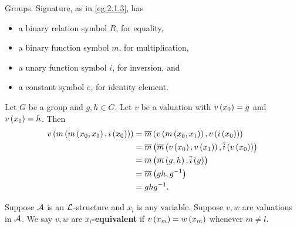 \begin{example*}
Groups. Signature, as in \ref{eg:2.1.3}, has
\begin{itemize}
\item a binary relation symbol $ R $, for equality,
\item a binary function symbol $ m $, for multiplication,
\item a unary function symbol $ i $, for inversion, and
\item a constant symbol $ e $, for identity element.
\end{itemize}
Let $ G $ be a group and $ g, h \in G $. Let $ v $ be a valuation with $ v\rb{x_0} = g $ and $ v\rb{x_1} = h $. Then
\begin{align*}
v\rb{m\rb{m\rb{x_0, x_1}, i\rb{x_0}}}
& = \overline{m}\rb{v\rb{m\rb{x_0, x_1}}, v\rb{i\rb{x_0}}} \\
& = \overline{m}\rb{\overline{m}\rb{v\rb{x_0}, v\rb{x_1}}, \overline{i}\rb{v\rb{x_0}}} \\
& = \overline{m}\rb{\overline{m}\rb{g, h}, \overline{i}\rb{g}} \\
& = \overline{m}\rb{gh, g^{-1}} \\
& = ghg^{-1}.
\end{align*}
\end{example*}

\begin{definition}
Suppose $ \AA $ is an $ \LL $-structure and $ x_l $ is any variable. Suppose $ v, w $ are valuations in $ \AA $. We say $ v, w $ are \textbf{$ x_l $-equivalent} if $ v\rb{x_m} = w\rb{x_m} $ whenever $ m \ne l $.
\end{definition}

\pagebreak

